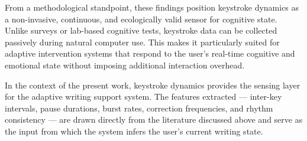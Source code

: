 From a methodological standpoint, these findings position keystroke dynamics as a non-invasive, continuous, and ecologically valid sensor for cognitive state. Unlike surveys or lab-based cognitive tests, keystroke data can be collected passively during natural computer use. This makes it particularly suited for adaptive intervention systems that respond to the user's real-time cognitive and emotional state without imposing additional interaction overhead.

In the context of the present work, keystroke dynamics provides the sensing layer for the adaptive writing support system. The features extracted --- inter-key intervals, pause durations, burst rates, correction frequencies, and rhythm consistency --- are drawn directly from the literature discussed above and serve as the input from which the system infers the user's current writing state.

